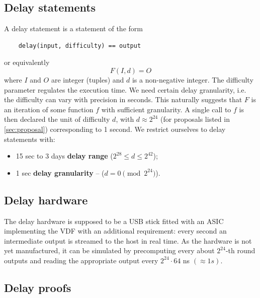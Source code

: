 \documentclass{article}
\begin{document}
\subsection{ Delay statements}

A delay statement is a statement of the form \begin{verbatim}
    delay(input, difficulty) == output
\end{verbatim} or equivalently
$$
F(I,d) = O
$$
where $I$ and $O$  are  integer (tuples)  and $d$  is a non-negative integer. The difficulty parameter regulates the execution time. We need certain delay granularity, i.e. the difficulty can vary with precision in seconds. This naturally suggests that $F$ is an iteration of some function $f$ with sufficient granularity. A single call to $f$ is then declared the unit of difficulty $d$, with $d\approx 2^{24}$ (for proposals listed in \cref{sec:proposal}) corresponding to 1 second. We restrict ourselves to delay statements with:
\begin{itemize}
    \item 15 sec to 3 days \textbf{delay range} ($2^{28}\leq d\leq 2^{42}$);
    \item  1 sec \textbf{delay granularity} --  ($d =0 \pmod{ 2^{24}}$).
\end{itemize}

\subsection{ Delay hardware}

The delay hardware is supposed to be a USB stick fitted with an ASIC implementing the VDF with  an additional requirement: every second an intermediate output   is streamed to the host in real time. As the  hardware is not yet manufactured, it can   be simulated by precomputing every about $2^{24}$-th round outputs and reading the appropriate output every $2^{24}\cdot 64$ ns $(\approx 1s)$.



\subsection{ Delay proofs}\label{sec:proofs}
\end{document}

